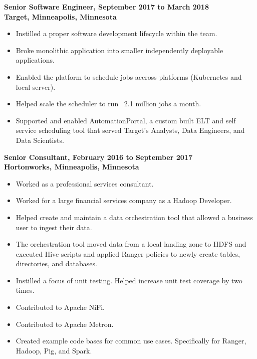 \documentclass[margin]{res}
\begin{document}
\begin{resume}
 {\bf Senior Software Engineer, September 2017 to March 2018\\
 Target, Minneapolis, Minnesota}
 \begin{itemize} \itemsep -2pt
 \item Instilled a proper software development lifecycle within the team.
 \item Broke monolithic application into smaller independently deployable applications.
 \item Enabled the platform to schedule jobs accross platforms (Kubernetes and local server).
 \item Helped scale the scheduler to run ~2.1 million jobs a month.
 \item Supported and enabled AutomationPortal, a custom built ELT and self service scheduling tool that served Target's Analysts, Data Engineers, and Data Scientists.
 \end{itemize}

 {\bf  Senior Consultant, February 2016 to September 2017\\
 Hortonworks, Minneapolis, Minnesota}
 \begin{itemize} \itemsep -2pt
 \item Worked as a professional services consultant.
 \item Worked for a large financial services company as a Hadoop Developer. 
 \item Helped create and maintain a data orchestration tool that allowed a business user to ingest their data.
 \item The orchestration tool moved data from a local landing zone to HDFS and executed Hive scripts and applied Ranger policies to newly create tables, directories, and databases.
 \item Instilled a focus of unit testing. Helped increase unit test coverage by two times.
 \item Contributed to Apache NiFi.
 \item Contributed to Apache Metron.
 \item Created example code bases for common use cases. Specifically for Ranger, Hadoop, Pig, and Spark.
 \end{itemize}
 

\end{resume}
\end{document}
